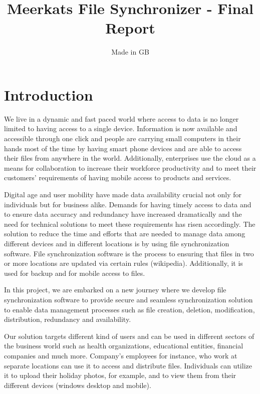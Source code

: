 \documentclass{article}
\title{Meerkats File Synchronizer - Final Report}
\author{Made in GB}
\date{}
\begin{document}
\maketitle{}

\tableofcontents
\newpage

\section{Introduction}
We live in a dynamic and fast paced world where access to data is no longer limited to having access to a single device. Information is now available and accessible through one click and people are carrying small computers in their hands most of the time by having smart phone devices and are able to access their files from anywhere in the world. Additionally, enterprises use the cloud as a means for collaboration to increase their workforce productivity and to meet their customers’ requirements of having mobile access to products and services.

Digital age and user mobility have made data availability crucial not only for individuals but for business alike. Demands for having timely access to data and to ensure data accuracy and redundancy have increased dramatically and the need for technical solutions to meet these requirements has risen accordingly. The solution to reduce the time and efforts that are needed to manage data among different devices and in different locations is by using file synchronization software. File synchronization software is the process to ensuring that files in two or more locations are updated via certain rules (wikipedia). Additionally, it is used for backup and for mobile access to files.

\newline
\hfill \break
In this project, we are embarked on a new journey where we develop file synchronization software to provide secure and seamless synchronization solution to enable data management processes such as file creation, deletion, modification, distribution, redundancy and availability.

Our solution targets different kind of users and can be used in different sectors of the business world such as health organizations, educational entities, financial companies and much more. Company’s employees for instance, who work at separate locations can use it to access and distribute files. Individuals can utilize it to upload their holiday photos, for example, and to view them from their different devices (windows desktop and mobile).
\end{document}
